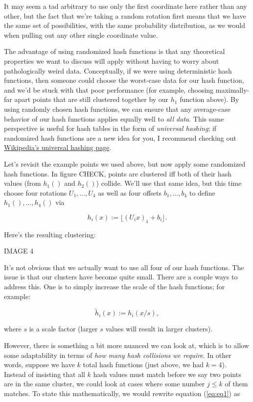 \documentclass[20pt,]{extarticle}
\begin{document}
It may seem a tad arbitrary to use only the first coordinate here rather
than any other, but the fact that we're taking a random rotation first
means that we have the same set of possibilities, with the same
probability distribution, as we would when pulling out any other single
coordinate value.

The advantage of using randomized hash functions is that any theoretical
properties we want to discuss will apply without having to worry about
pathologically weird data. Conceptually, if we were using deterministic
hash functions, then someone could choose the worst-case data for our
hash function, and we'd be stuck with that poor performance (for
example, choosing maximally-far apart points that are still clustered
together by our \(h_1\) function above). By using randomly chosen hash
functions, we can ensure that any average-case behavior of our hash
functions applies equally well to \emph{all data}. This same perspective
is useful for hash tables in the form of \emph{universal hashing}; if
randomized hash functions are a new idea for you, I recommend checking
out \href{https://en.wikipedia.org/wiki/Universal_hashing}{Wikipedia's
universal hashing page}.

Let's revisit the example points we used above, but now apply some
randomized hash functions. In figure CHECK, points are clustered iff
both of their hash values (from \(h_1()\) and \(h_2()\)) collide. We'll
use that same idea, but this time choose four rotations
\(U_1, \ldots, U_4\) as well as four offsets \(b_1, \ldots, b_4\) to
define \(h_1(), \ldots, h_4()\) via

\[ h_i(x) := \lfloor (U_i x)_1 + b_i \rfloor. \]

Here's the resulting clustering:

IMAGE 4

It's not obvious that we actually want to use all four of our hash
functions. The issue is that our clusters have become quite small. There
are a couple ways to address this. One is to simply increase the scale
of the hash functions; for example:

\[ \tilde h_i(x) := h_i(x/s), \]

where \(s\) is a scale factor (larger \(s\) values will result in larger
clusters).

However, there is something a bit more nuanced we can look at, which is
to allow some adaptability in terms of \emph{how many hash collisions we
require}. In other words, suppose we have \(k\) total hash functions
(just above, we had \(k=4\)). Instead of insisting that all \(k\) hash
values must match before we say two points are in the same cluster, we
could look at cases where some number \(j \le k\) of them matches. To
state this mathematically, we would rewrite equation (\ref{eq:eq1}) as
\end{document}
